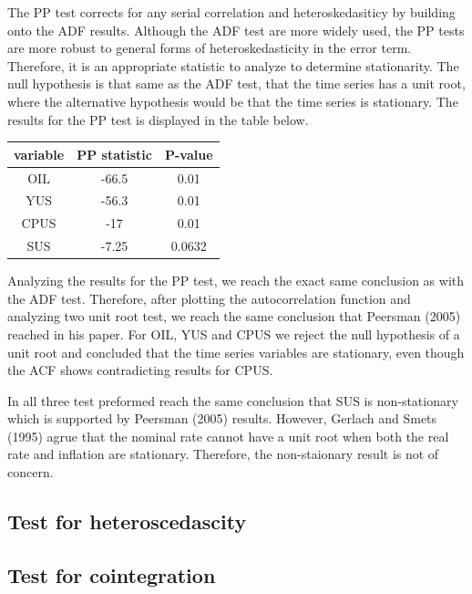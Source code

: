 \documentclass[11pt,preprint, authoryear]{elsarticle}
\numberwithin{equation}{section}
\numberwithin{figure}{section}
\numberwithin{table}{section}
\begin{document}
The PP test corrects for any serial correlation and heteroskedasiticy by
building onto the ADF results. Although the ADF test are more widely
used, the PP tests are more robust to general forms of
heteroskedasticity in the error term. Therefore, it is an appropriate
statistic to analyze to determine stationarity. The null hypothesis is
that same as the ADF test, that the time series has a unit root, where
the alternative hypothesis would be that the time series is stationary.
The results for the PP test is displayed in the table below.

\begin{center}
\begin{tabular}{ |c|c|c| } 
 \hline
 variable & PP statistic & P-value \\ 
 \hline
 OIL & -66.5 & 0.01\\ 
 YUS & -56.3 & 0.01 \\
 CPUS & -17 & 0.01 \\
 SUS & -7.25 & 0.0632 \\
 \hline
\end{tabular}
\end{center}

Analyzing the results for the PP test, we reach the exact same
conclusion as with the ADF test. Therefore, after plotting the
autocorrelation function and analyzing two unit root test, we reach the
same conclusion that Peersman (2005) reached in his paper. For OIL, YUS
and CPUS we reject the null hypothesis of a unit root and concluded that
the time series variables are stationary, even though the ACF shows
contradicting results for CPUS.

In all three test preformed reach the same conclusion that SUS is
non-stationary which is supported by Peersman (2005) results. However,
Gerlach and Smets (1995) agrue that the nominal rate cannot have a unit
root when both the real rate and inflation are stationary. Therefore,
the non-staionary result is not of concern.

\hypertarget{test-for-heteroscedascity}{%
\subsection{Test for heteroscedascity}\label{test-for-heteroscedascity}}

\hypertarget{test-for-cointegration}{%
\subsection{Test for cointegration}\label{test-for-cointegration}}
\end{document}
